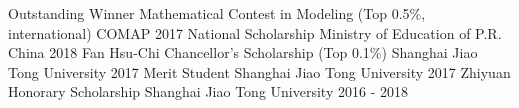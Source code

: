 
\begin{cvhonors}
	\cvaward
	{Outstanding Winner}
	{Mathematical Contest in Modeling (Top 0.5\%, international)}
	{COMAP}
	{2017}
    \cvhonor
    {National Scholarship}
    {Ministry of Education of P.R. China}
    {2018}
	\cvaward
    {Fan Hsu-Chi Chancellor's Scholarship}
    {(Top 0.1\%)}
	{Shanghai Jiao Tong University}
	{2017}
    \cvhonor
    {Merit Student}
    {Shanghai Jiao Tong University}
    {2017}
    \cvhonor
    {Zhiyuan Honorary Scholarship}
    {Shanghai Jiao Tong University}
    {2016 - 2018}
\end{cvhonors}
